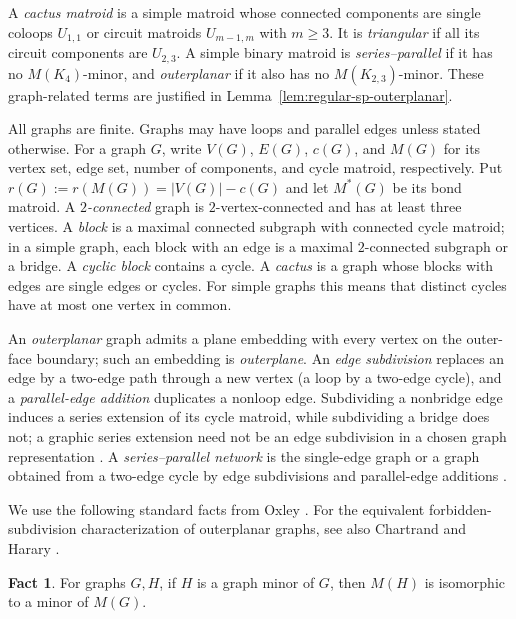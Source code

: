 \documentclass[12pt,a4paper]{article}
\numberwithin{equation}{section}
\theoremstyle{definition}
\newtheorem{fact}{Fact}[section]
\theoremstyle{remark}
\begin{document}
A \emph{cactus matroid} is a simple matroid whose connected components are single
coloops \(U_{1,1}\) or circuit matroids \(U_{m-1,m}\) with \(m\ge3\).  It is
\emph{triangular} if all its circuit components are \(U_{2,3}\).
A simple binary matroid is \emph{series--parallel} if it has no
\(M(K_4)\)-minor, and \emph{outerplanar} if it also has no
\(M(K_{2,3})\)-minor.  These graph-related terms are justified in
Lemma~\ref{lem:regular-sp-outerplanar}.

All graphs are finite.  Graphs may have loops and parallel edges unless
stated otherwise.  For a graph \(G\), write \(V(G)\), \(E(G)\),
\(c(G)\), and \(M(G)\) for its vertex set, edge set, number of
components, and cycle matroid, respectively.  Put
\(r(G):=r(M(G))=|V(G)|-c(G)\) and let \(M^*(G)\) be its bond
matroid.  A \emph{\(2\)-connected} graph is \(2\)-vertex-connected
and has at least three vertices.  A \emph{block} is a maximal
connected subgraph with connected cycle matroid; in a simple graph,
each block with an edge is a maximal \(2\)-connected subgraph or a bridge.
A \emph{cyclic block} contains a cycle.  A \emph{cactus} is a graph
whose blocks with edges are single edges or cycles.  For simple graphs this
means that distinct cycles have at most one vertex in common.

An \emph{outerplanar} graph admits a plane embedding with every
vertex on the outer-face boundary; such an embedding is
\emph{outerplane}.  An \emph{edge subdivision} replaces an edge by
a two-edge path through a new vertex (a loop by a two-edge cycle),
and a \emph{parallel-edge addition} duplicates a nonloop edge.
Subdividing a nonbridge edge induces a series extension of its cycle
matroid, while subdividing a bridge does not; a graphic series
extension need not be an edge subdivision in a chosen graph
representation \cite[pp.~151--152 and Figure~5.13]{oxley}.
A \emph{series--parallel network} is the single-edge graph or a
graph obtained from a two-edge cycle by edge subdivisions and
parallel-edge additions \cite[Section~5.4, Exercise~8]{oxley}.

We use the following standard facts from Oxley
\cite[Chapters~3--6 and Section~12.2, Exercise~14(a)]{oxley}.
For the equivalent forbidden-subdivision characterization of outerplanar
graphs, see also Chartrand and Harary
\cite[Theorem~1]{chartrand-harary}.

\begin{fact}\label{fact:graph-minors}
For graphs \(G,H\), if \(H\) is a graph minor of \(G\), then
\(M(H)\) is isomorphic to a minor of \(M(G)\).
\end{fact}
\end{document}
